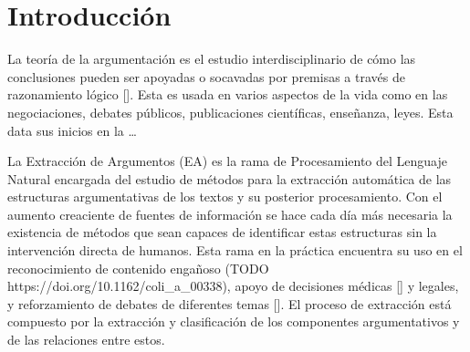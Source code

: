 \chapter*{Introducción}\label{chapter:introduction}

La teoría de la argumentación es el estudio interdisciplinario de cómo las conclusiones
pueden ser apoyadas o socavadas por premisas a través de razonamiento lógico [\cite{wiki-arg-theory}].
Esta es usada en varios aspectos de la vida como en las negociaciones, debates públicos, 
publicaciones científicas, enseñanza, leyes. Esta data sus inicios en la \dots

La Extracción de Argumentos (EA) es la rama de Procesamiento del Lenguaje Natural encargada
del estudio de métodos para la extracción automática de las estructuras argumentativas de 
los textos y su posterior procesamiento. Con el aumento creaciente de fuentes de información
se hace cada día más necesaria la existencia de métodos que sean capaces de identificar estas
estructuras sin la intervención directa de humanos. Esta rama en la práctica encuentra su uso
en el reconocimiento de contenido engañoso (TODO https://doi.org/10.1162/coli_a_00338), apoyo de 
decisiones médicas [\cite{mayer2020transformer}] y legales, y reforzamiento de debates de
diferentes temas [\cite{niculae2017argument}]. El proceso de extracción está compuesto por 
la extracción y clasificación de los componentes argumentativos y de las relaciones entre estos. 
